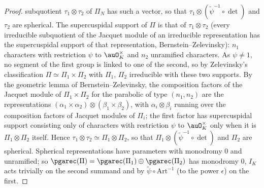 \documentclass[10pt]{amsart}
\theoremstyle{definition}
\theoremstyle{remark}
\begin{document}
\begin{proof}
subquotient $\tau_1\otimes\tau_2$ of $\Pi_N$ has such a vector, so that $\tau_1\otimes(\tilde\psi^{-1}
\circ\det)$ and $\tau_2$ are spherical. The supercuspidal support of $\Pi$ is that of
$\tau_1\otimes\tau_2$ (every irreducible subquotient of the Jacquet module of an irreducible
representation has the supercuspidal support of that representation, Bernstein--Zelevinsky): $n_1$
characters with restriction $\psi$ to $\auO_K^\times$ and $n_2$ unramified characters. As $\psi\ne1$, no
segment of the first group is linked to one of the second, so by Zelevinsky's classification
$\Pi\simeq\Pi_1\times\Pi_2$ with $\Pi_1$, $\Pi_2$ irreducible with these two supports. By the
geometric lemma of Bernstein--Zelevinsky, the composition factors of the Jacquet module of
$\Pi_1\times\Pi_2$ for the parabolic of type $(n_1,n_2)$ are the representations
$(\alpha_1\times\alpha_2)\otimes(\beta_1\times\beta_2)$, with $\alpha_i\otimes\beta_i$ running over the
composition factors of Jacquet modules of $\Pi_i$; the first factor has supercuspidal support
consisting only of characters with restriction $\psi$ to $\auO_K^\times$ only when it is
$\Pi_1\otimes\Pi_2$ itself. Hence $\tau_1\otimes\tau_2\simeq\Pi_1\otimes\Pi_2$, so that
$\Pi_1\otimes(\tilde\psi^{-1}\circ\det)$ and $\Pi_2$ are spherical. Spherical
representations have parameters with monodromy $0$ and unramified; so $\pgarec(\Pi)=
\pgarec(\Pi_1)\oplus\pgarec(\Pi_2)$ has monodromy $0$, $I_K$ acts trivially on the second summand
and by $\tilde\psi\circ\mathrm{Art}^{-1}$ (to the power $\epsilon$) on the first.
\end{proof}
\end{document}

